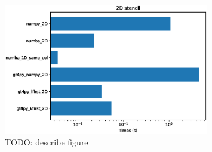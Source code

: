 \documentclass[12pt]{article}
\begin{document}
\begin{figure}[H]
    \centering
    \includegraphics[width=0.8\textwidth]{2d_stencil.eps}
    \caption{{\color{red}TODO: describe figure}}
    \label{fig:stencil_2D}
\end{figure}
\end{document}
